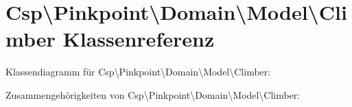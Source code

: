 \hypertarget{classCsp_1_1Pinkpoint_1_1Domain_1_1Model_1_1Climber}{}\section{Csp\textbackslash{}Pinkpoint\textbackslash{}Domain\textbackslash{}Model\textbackslash{}Climber Klassenreferenz}
\label{classCsp_1_1Pinkpoint_1_1Domain_1_1Model_1_1Climber}


Klassendiagramm für Csp\textbackslash{}Pinkpoint\textbackslash{}Domain\textbackslash{}Model\textbackslash{}Climber\+:


Zusammengehörigkeiten von Csp\textbackslash{}Pinkpoint\textbackslash{}Domain\textbackslash{}Model\textbackslash{}Climber\+:
